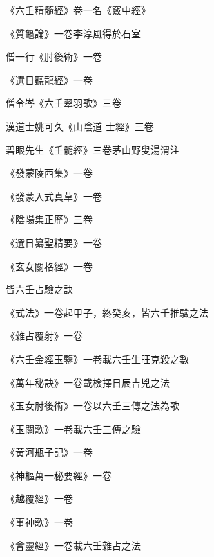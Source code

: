 \begin{pinyinscope}
 《六壬精髓經》卷一名《竅中經》



 《質龜論》一卷李淳風得於石室



 僧一行《肘後術》一卷



 《選日聽龍經》一卷



 僧令岑《六壬翠羽歌》三卷



 漢道士姚可久《山陰道
 士經》三卷



 碧眼先生《壬髓經》三卷茅山野叟湯渭注



 《發蒙陵西集》一卷



 《發蒙入式真草》一卷



 《陰陽集正歷》三卷



 《選日纂聖精要》一卷



 《玄女關格經》一卷



 皆六壬占驗之訣



 《式法》一卷起甲子，終癸亥，皆六壬推驗之法



 《雜占覆射》一卷



 《六壬金經玉鑒》一卷載六壬生旺克殺之數



 《萬年秘訣》一卷載檢擇日辰吉兇之法



 《玉女肘後術》一卷以六壬三傳之法為歌



 《玉關歌》一卷載六壬三傳之驗



 《黃河瓶子記》一卷



 《神樞萬一秘要經》一卷



 《越覆經》一卷



 《事神歌》一卷



 《會靈經》一卷載六壬雜占之法




\end{pinyinscope}
